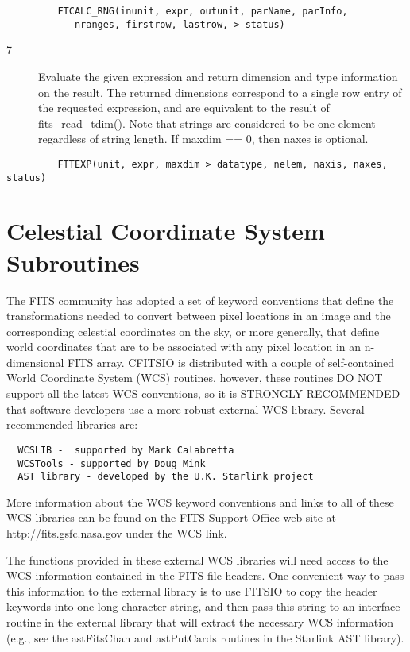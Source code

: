 \documentclass[11pt]{book}
\begin{document}
\begin{verbatim}
         FTCALC_RNG(inunit, expr, outunit, parName, parInfo,
            nranges, firstrow, lastrow, > status)
\end{verbatim}

\begin{description}
\item[7 ]Evaluate the given expression and return dimension and type information
on the result.  The returned dimensions correspond to a single row entry
of the requested expression, and are equivalent to the result of fits\_read\_tdim().
Note that strings are considered to be one element regardless of string length.
If maxdim == 0, then naxes is optional.
\end{description}

\begin{verbatim}
         FTTEXP(unit, expr, maxdim > datatype, nelem, naxis, naxes, status)
\end{verbatim}



\section{Celestial Coordinate System Subroutines \label{FTGICS}}

The FITS community has adopted a set of keyword conventions that define
the transformations needed to convert between pixel locations in an
image and the corresponding celestial coordinates on the sky, or more
generally, that define world coordinates that are to be associated with
any pixel location in an n-dimensional FITS array. CFITSIO is distributed
with a couple of self-contained World Coordinate System (WCS) routines,
however, these routines DO NOT support all the latest WCS conventions,
so it is STRONGLY RECOMMENDED that software developers use a more robust
external WCS library.  Several recommended libraries are:

\begin{verbatim}
  WCSLIB -  supported by Mark Calabretta
  WCSTools - supported by Doug Mink
  AST library - developed by the U.K. Starlink project
\end{verbatim}

More information about the WCS keyword conventions and links to all of
these WCS libraries can be found on the FITS Support Office web site at
http://fits.gsfc.nasa.gov under the WCS link.

The functions provided in these external WCS libraries will need access to
the  WCS information contained in the FITS file headers.  One convenient
way to pass this information to the external library is to use  FITSIO
to copy the header keywords into one long character string, and then
pass this string to an interface routine in the external library that
will extract the necessary WCS information (e.g., see the astFitsChan
and astPutCards routines in the Starlink AST library).
\end{document}
